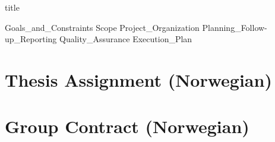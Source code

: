 \documentclass{article}
\begin{document}
{title}

\frontmatter

\begingroup
\hypersetup{hidelinks}

\tableofcontents

\listoffigures
\listoftables
\endgroup



\mainmatter

{Goals_and_Constraints}
{Scope}
{Project_Organization}
{Planning_Follow-up_Reporting}
{Quality_Assurance}
{Execution_Plan}

\newpage
\printbibliography[heading = bibintoc, title = Bibliography]

\addappendix

\section{Thesis Assignment (Norwegian)}
\label{appendix:thesis_assignment}

\begin{minipage}{\textwidth}
    \centering
    
\end{minipage}



\section{Group Contract (Norwegian)}
\label{appendix:group_contract}

\begin{minipage}{\textwidth}
    \centering
    
\end{minipage}

\end{document}
